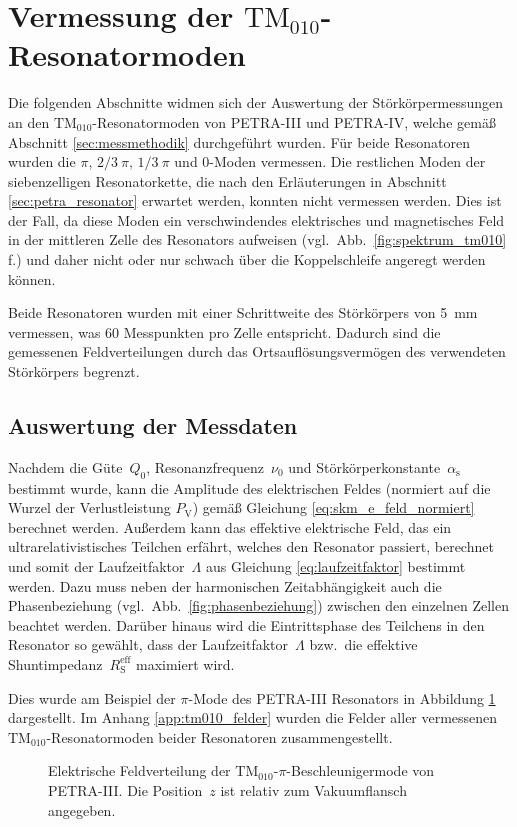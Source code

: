 \section{Vermessung der $\mathrm{TM}_{010}$-Resonatormoden}
\label{sec:tm010_messung}
Die folgenden Abschnitte widmen sich der Auswertung der Störkörpermessungen an den $\mathrm{TM}_{010}$-Resonatormoden von PETRA-III und PETRA-IV, welche gemäß Abschnitt \ref{sec:messmethodik} durchgeführt wurden.
Für beide Resonatoren wurden die $\pi,\, 2/3~\pi, \, 1/3~\pi$ und $0$-Moden vermessen.
Die restlichen Moden der siebenzelligen Resonatorkette, die nach den Erläuterungen in Abschnitt \ref{sec:petra_resonator} erwartet werden, konnten nicht vermessen werden.
Dies ist der Fall, da diese Moden ein verschwindendes elektrisches und magnetisches Feld in der mittleren Zelle des Resonators aufweisen (vgl.\ Abb.\ \ref{fig:spektrum_tm010} f.) und daher nicht oder nur schwach über die Koppelschleife angeregt werden können.

Beide Resonatoren wurden mit einer Schrittweite des Störkörpers von \SI{5}{mm} vermessen, was \num{60} Messpunkten pro Zelle entspricht.
Dadurch sind die gemessenen Feldverteilungen durch das Ortsauflösungsvermögen des verwendeten Störkörpers begrenzt.

\subsection{Auswertung der Messdaten}
Nachdem die Güte~$Q_0$, Resonanzfrequenz~$\nu_0$ und Störkörperkonstante~$\alpha_\mathrm{s}$ bestimmt wurde, kann die Amplitude des elektrischen Feldes (normiert auf die Wurzel der Verlustleistung $P_\mathrm{V}$) gemäß Gleichung \eqref{eq:skm_e_feld_normiert} berechnet werden.
Außerdem kann das effektive elektrische Feld, das ein ultrarelativistisches Teilchen erfährt, welches den Resonator passiert, berechnet und somit der Laufzeitfaktor~$\Lambda$ aus Gleichung \eqref{eq:laufzeitfaktor} bestimmt werden.
Dazu muss neben der harmonischen Zeitabhängigkeit auch die Phasenbeziehung (vgl.\ Abb.\ \ref{fig:phasenbeziehung}) zwischen den einzelnen Zellen beachtet werden.
Darüber hinaus wird die Eintrittsphase des Teilchens in den Resonator so gewählt, dass der Laufzeitfaktor~$\Lambda$ bzw.\ die effektive Shuntimpedanz~$R_\mathrm{S}^\mathrm{eff}$ maximiert wird.

Dies wurde am Beispiel der $\pi$-Mode des PETRA-III Resonators in Abbildung \ref{fig:bsp_feld_tm010pi_petra3} dargestellt.
Im Anhang \ref{app:tm010_felder} wurden die Felder aller vermessenen $\mathrm{TM}_{010}$-Resonatormoden beider Resonatoren zusammengestellt.  
\begin{figure}[h]
	\centering
	
	\caption[Elektrische Feldverteilung der $\mathrm{TM}_{010}\text{-}\pi$-Beschleunigermode von PETRA-III]{Elektrische Feldverteilung der $\mathrm{TM}_{010}\text{-}\pi$-Beschleunigermode von PETRA-III. Die Position~$z$ ist relativ zum Vakuumflansch angegeben.}
	\label{fig:bsp_feld_tm010pi_petra3}
\end{figure}

